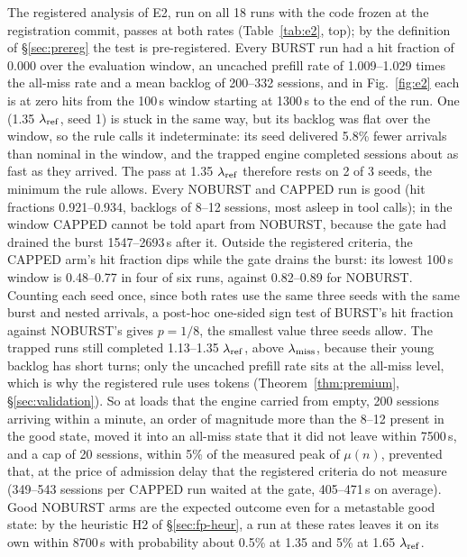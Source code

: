 The registered analysis of E2, run on all 18 runs with the code frozen at the registration commit, passes at both rates (Table~\ref{tab:e2}, top); by the definition of \S\ref{sec:prereg} the test is pre-registered. Every BURST run had a hit fraction of 0.000 over the evaluation window, an uncached prefill rate of 1.009--1.029 times the all-miss rate and a mean backlog of 200--332 sessions, and in Fig.~\ref{fig:e2} each is at zero hits from the 100\,s window starting at 1300\,s to the end of the run. One (1.35 $\lambda_{\mathrm{ref}}$, seed 1) is stuck in the same way, but its backlog was flat over the window, so the rule calls it indeterminate: its seed delivered 5.8\% fewer arrivals than nominal in the window, and the trapped engine completed sessions about as fast as they arrived. The pass at 1.35 $\lambda_{\mathrm{ref}}$ therefore rests on 2 of 3 seeds, the minimum the rule allows. Every NOBURST and CAPPED run is good (hit fractions 0.921--0.934, backlogs of 8--12 sessions, most asleep in tool calls); in the window CAPPED cannot be told apart from NOBURST, because the gate had drained the burst 1547--2693\,s after it. Outside the registered criteria, the CAPPED arm's hit fraction dips while the gate drains the burst: its lowest 100\,s window is 0.48--0.77 in four of six runs, against 0.82--0.89 for NOBURST. Counting each seed once, since both rates use the same three seeds with the same burst and nested arrivals, a post-hoc one-sided sign test of BURST's hit fraction against NOBURST's gives $p=1/8$, the smallest value three seeds allow. The trapped runs still completed 1.13--1.35 $\lambda_{\mathrm{ref}}$, above $\lambda_{\mathrm{miss}}$, because their young backlog has short turns; only the uncached prefill rate sits at the all-miss level, which is why the registered rule uses tokens (Theorem~\ref{thm:premium}, \S\ref{sec:validation}). So at loads that the engine carried from empty, 200 sessions arriving within a minute, an order of magnitude more than the 8--12 present in the good state, moved it into an all-miss state that it did not leave within 7500\,s, and a cap of 20 sessions, within 5\% of the measured peak of $\mu(n)$, prevented that, at the price of admission delay that the registered criteria do not measure (349--543 sessions per CAPPED run waited at the gate, 405--471\,s on average). Good NOBURST arms are the expected outcome even for a metastable good state: by the heuristic H2 of \S\ref{sec:fp-heur}, a run at these rates leaves it on its own within 8700\,s with probability about 0.5\% at 1.35 and 5\% at 1.65 $\lambda_{\mathrm{ref}}$. 


